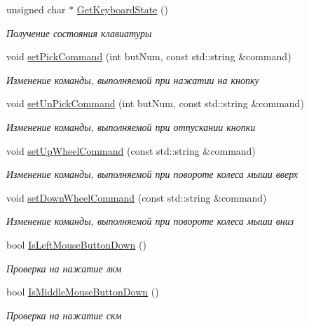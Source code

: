 \begin{DoxyCompactItemize}
unsigned char $\ast$ \hyperlink{class_input_class_ae197c072cb2056b75793f9d21be97787}{Get\+Keyboard\+State} ()
\begin{DoxyCompactList}\small\item\em Получение состояния клавиатуры \end{DoxyCompactList}\item 
void \hyperlink{class_input_class_a43d122fa4e954bd81ff46d5d7961da32}{set\+Pick\+Command} (int but\+Num, const std\+::string \&command)
\begin{DoxyCompactList}\small\item\em Изменение команды, выполняемой при нажатии на кнопку \end{DoxyCompactList}\item 
void \hyperlink{class_input_class_afbfa97735bac9adac4f70f9ddf02eed5}{set\+Un\+Pick\+Command} (int but\+Num, const std\+::string \&command)
\begin{DoxyCompactList}\small\item\em Изменение команды, выполняемой при отпускании кнопки \end{DoxyCompactList}\item 
void \hyperlink{class_input_class_ac1731c7de884d6fd26b2a56f1117ba7a}{set\+Up\+Wheel\+Command} (const std\+::string \&command)
\begin{DoxyCompactList}\small\item\em Изменение команды, выполняемой при повороте колеса мыши вверх \end{DoxyCompactList}\item 
void \hyperlink{class_input_class_a1abf408475290b47e68b438d2fc3f840}{set\+Down\+Wheel\+Command} (const std\+::string \&command)
\begin{DoxyCompactList}\small\item\em Изменение команды, выполняемой при повороте колеса мыши вниз \end{DoxyCompactList}\item 
bool \hyperlink{class_input_class_a39a7f997cbdd609f4bfcdd96444c585e}{Is\+Left\+Mouse\+Button\+Down} ()
\begin{DoxyCompactList}\small\item\em Проверка на нажатие лкм \end{DoxyCompactList}\item 
bool \hyperlink{class_input_class_a70052a24e82456ba33b38a41851e030b}{Is\+Middle\+Mouse\+Button\+Down} ()
\begin{DoxyCompactList}\small\item\em Проверка на нажатие скм \end{DoxyCompactList}\end{DoxyCompactItemize}
